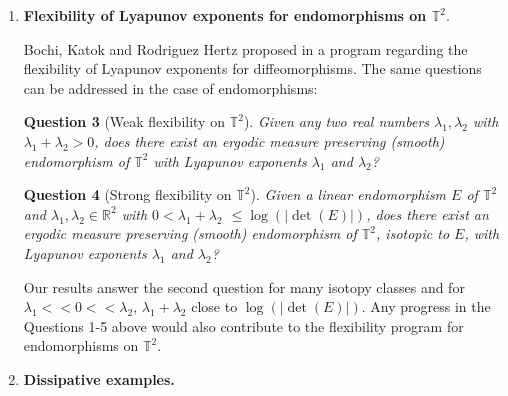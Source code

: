 \documentclass[11pt,letterpaper,reqno]{article}
\newtheorem{question}{Question}
\newcommand{\TT}{\mathbb{T}^2}
\newcommand{\RR}{\mathbb{R}^2}
\begin{document}
\begin{enumerate}
In general the continuity of the exponents may fail if parts of the stable lift of the measure to the projectivization of the cocycle move in the limit to parts of the unstable lift. But this would imply that the strong unstable subspaces are invariant under the $\pi_{ext}$ holonomy, and this seems to be a rigid situation. 
\begin{question}
Is it true that the average Lyapunov exponents are continuous in (an open dense subset of) the space of $\mathcal C^1$ area preserving endomorphisms of surfaces?
\end{question}
One may also ask how do the Lyapunov exponents depend on the invariant measure, not necessarily Lebesgue.
\begin{question}
Can we say something about the continuity of the Lyapunov exponents of maps in $\mathcal U_1$ with respect to the invariant measure, in a neighborhood of the Lebesgue measure?
\end{question}

\item {\bf Flexibility of Lyapunov exponents for endomorphisms on $\TT$}. 

Bochi, Katok and Rodriguez Hertz proposed in \cite{Bochi2019} a program regarding the flexibility of Lyapunov exponents for diffeomorphisms. The same questions can be addressed in the case of endomorphisms:

\begin{question}[Weak flexibility on $\TT$]
Given any two real numbers $\lambda_1,\lambda_2$ with $\lambda_1+\lambda_2> 0$, does there exist an ergodic measure preserving (smooth) endomorphism of $\TT$ with Lyapunov exponents $\lambda_1$ and $\lambda_2$?
\end{question}

\begin{question}[Strong flexibility on $\TT$]
Given a linear endomorphism $E$ of $\TT$ and $\lambda_1,\lambda_2\in \RR$ with $0<\lambda_1+\lambda_2$ $\leq\log(|\det(E)|)$, does there exist an ergodic measure preserving (smooth) endomorphism of $\TT$, isotopic to $E$, with Lyapunov exponents $\lambda_1$ and $\lambda_2$?
\end{question}

Our results answer the second question for many isotopy classes and for $\lambda_1<<0<<\lambda_2$, $\lambda_1+\lambda_2$ close to $\log(|\det(E)|)$. Any progress in the Questions 1-5 above would also contribute to the flexibility program for endomorphisms on $\TT$. 

\item {\bf Dissipative examples.}


\end{enumerate}
\end{document}
